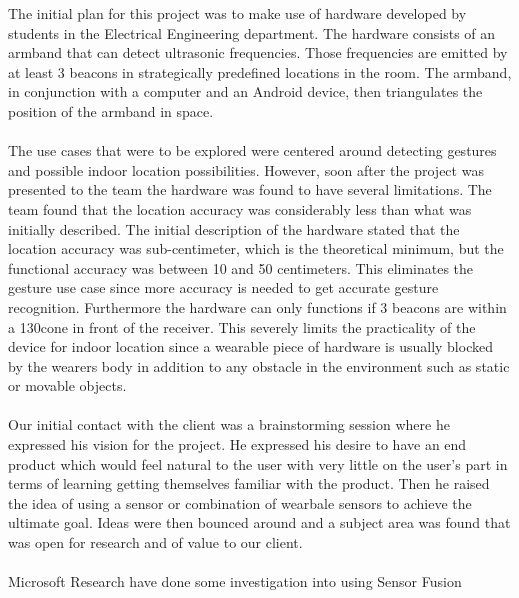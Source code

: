 \documentclass[prodmode,acmtosem]{acmsmall} %
\begin{document}

The initial plan for this project was to make use of hardware developed by students in the Electrical Engineering department. The hardware consists of an armband that can detect ultrasonic frequencies. Those frequencies are emitted by at least 3 beacons in strategically predefined locations in the room. The armband, in conjunction with a computer and an Android device, then triangulates the position of the armband in space.\\\\
The use cases that were to be explored were centered around detecting gestures and possible indoor location possibilities. However, soon after the project was presented to the team the hardware was found to have several limitations. The team found that the location accuracy was considerably less than what was initially described. The initial description of the hardware stated that the location accuracy was sub-centimeter, which is the theoretical minimum, but the functional accuracy was between 10 and 50 centimeters. This eliminates the gesture use case since more accuracy is needed to get accurate gesture recognition.
Furthermore the hardware can only functions if 3 beacons are within a 130\degree cone in front of the receiver. This severely limits the practicality of the device for indoor location since a wearable piece of hardware is usually blocked by the wearers body in addition to any obstacle in the environment such as static or movable objects.\\\\
Our initial contact with the client was a brainstorming session where he expressed his vision for the project. He expressed his desire to have an end product which would feel natural to the user with very little on the user's part in terms of learning getting themselves familiar with the product. Then he raised the idea of using a sensor or combination of wearbale sensors to achieve the ultimate goal. Ideas were then bounced around and a subject area was found that was open for research and of value to our client.\\\\
Microsoft Research have done some investigation into using Sensor Fusion
\end{document}
